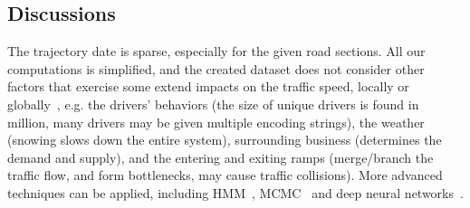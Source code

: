 \documentclass[5pt]{article}
\numberwithin{table}{section}
\begin{document}
\subsection*{Discussions}
The trajectory date is sparse, especially for the given road sections. All our computations is simplified, and the created dataset does not consider other factors that exercise some extend impacts on the traffic speed, locally or globally~\cite{woodard2017predicting}, e.g. the drivers' behaviors (the size of unique drivers is found in million, many drivers may be given multiple encoding strings), the weather (snowing slows down the entire system), surrounding business (determines the demand and supply), and the entering and exiting ramps (merge/branch the traffic flow, and form bottlenecks, may cause traffic collisions). More advanced techniques can be applied, including HMM~\cite{friedman2001elements}, MCMC~\cite{woodard2017predicting} and deep neural networks~\cite{goodfellow2016deep}.



\end{document}
